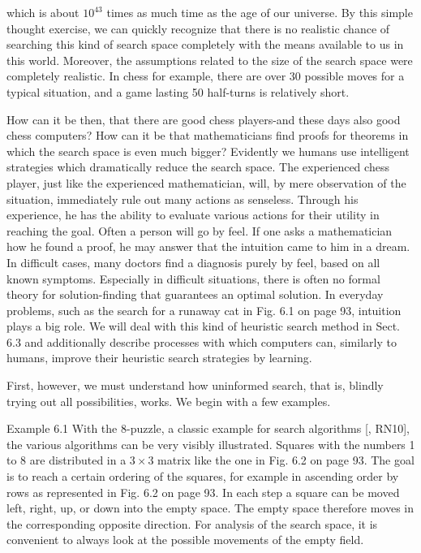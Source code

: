 \documentclass[10pt]{book}
\begin{document}
which is about $10^{43}$ times as much time as the age of our universe. By this simple thought exercise, we can quickly recognize that there is no realistic chance of searching this kind of search space completely with the means available to us in this world. Moreover, the assumptions related to the size of the search space were completely realistic. In chess for example, there are over 30 possible moves for a typical situation, and a game lasting 50 half-turns is relatively short.

How can it be then, that there are good chess players-and these days also good chess computers? How can it be that mathematicians find proofs for theorems in which the search space is even much bigger? Evidently we humans use intelligent strategies which dramatically reduce the search space. The experienced chess player, just like the experienced mathematician, will, by mere observation of the situation, immediately rule out many actions as senseless. Through his experience, he has the ability to evaluate various actions for their utility in reaching the goal. Often a person will go by feel. If one asks a mathematician how he found a proof, he may answer that the intuition came to him in a dream. In difficult cases, many doctors find a diagnosis purely by feel, based on all known symptoms. Especially in difficult situations, there is often no formal theory for solution-finding that guarantees an optimal solution. In everyday problems, such as the search for a runaway cat in Fig. 6.1 on page 93, intuition plays a big role. We will deal with this kind of heuristic search method in Sect. 6.3 and additionally describe processes with which computers can, similarly to humans, improve their heuristic search strategies by learning.

First, however, we must understand how uninformed search, that is, blindly trying out all possibilities, works. We begin with a few examples.

Example 6.1 With the 8-puzzle, a classic example for search algorithms [\cite{nil98}, RN10], the various algorithms can be very visibly illustrated. Squares with the numbers 1 to 8 are distributed in a $3 \times 3$ matrix like the one in Fig. 6.2 on page 93. The goal is to reach a certain ordering of the squares, for example in ascending order by rows as represented in Fig. 6.2 on page 93. In each step a square can be moved left, right, up, or down into the empty space. The empty space therefore moves in the corresponding opposite direction. For analysis of the search space, it is convenient to always look at the possible movements of the empty field.
\end{document}
